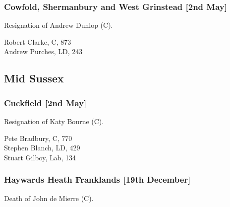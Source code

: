 \documentclass[a4paper,openany,10pt]{book}
\begin{document}
\subsubsection*{Cowfold, Shermanbury and West Grinstead \hspace*{\fill}\nolinebreak[1]%
\enspace\hspace*{\fill}
[2nd May]}


Resignation of Andrew Dunlop (C).



Robert Clarke, C, 873\\
Andrew Purches, LD, 243\\


\subsection*{Mid Sussex}

\subsubsection*{Cuckfield \hspace*{\fill}\nolinebreak[1]%
\enspace\hspace*{\fill}
[2nd May]}


Resignation of Katy Bourne (C).



Pete Bradbury, C, 770\\
Stephen Blanch, LD, 429\\
Stuart Gilboy, Lab, 134\\


\subsubsection*{Haywards Heath Franklands \hspace*{\fill}\nolinebreak[1]%
\enspace\hspace*{\fill}
[19th December]}


Death of John de Mierre (C).
\end{document}
